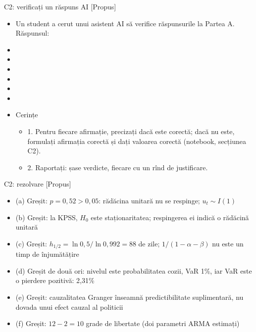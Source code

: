 \begin{frame}{C2: verificați un răspuns AI [Propus]}
\itemsize{\scriptsize}
\begin{itemize}
    \item Un student a cerut unui asistent AI să verifice răspunsurile la Partea A. Răspunsul:
    \item {}
    \item {}
    \item {}
    \item {}
    \item {}
    \item {}
    \item Cerințe
    \begin{itemize}
        \item 1. Pentru fiecare afirmație, precizați dacă este corectă; dacă nu este, formulați afirmația corectă și dați valoarea corectă (notebook, secțiunea C2).
        \item 2. Raportați: șase verdicte, fiecare cu un rînd de justificare.
    \end{itemize}
\end{itemize}
\end{frame}

\ifsolutions
\begin{frame}{C2: rezolvare [Propus]}
\itemsize{\footnotesize}
\begin{itemize}
    \item (a) Greșit: $p = 0{,}52 > 0{,}05$: rădăcina unitară nu se respinge; $u_t \sim I(1)$
    \item (b) Greșit: la KPSS, $H_0$ este staționaritatea; respingerea ei indică o rădăcină unitară
    \item (c) Greșit: $h_{1/2} = \ln 0{,}5/\ln 0{,}992 = 88$ de zile; $1/(1 - \alpha - \beta)$ nu este un timp de înjumătățire
    \item (d) Greșit de două ori: nivelul este probabilitatea cozii, VaR 1\%, iar VaR este o pierdere pozitivă: 2{,}31\%
    \item (e) Greșit: cauzalitatea Granger înseamnă predictibilitate suplimentară, nu dovada unui efect cauzal al politicii
    \item (f) Greșit: $12 - 2 = 10$ grade de libertate (doi parametri ARMA estimați)
\end{itemize}
\end{frame}
\fi


